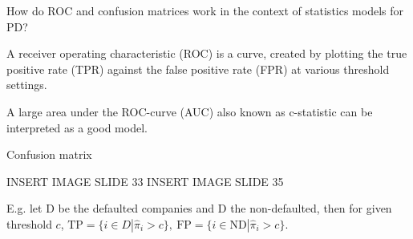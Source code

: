 How do ROC and confusion matrices work in the context of statistics models for PD?


A receiver operating characteristic (ROC) is a curve, created by plotting the
true positive rate (TPR) against the false positive rate (FPR) at various
threshold settings.

A large area under the ROC-curve (AUC) also known as c-statistic can be interpreted as a good model.

Confusion matrix

INSERT IMAGE SLIDE 33
INSERT IMAGE SLIDE 35



E.g. let \( \text{D} \) be the defaulted companies and \( \text{D} \) the non-defaulted,
then for given threshold \( c \), \( \text{TP} = \{i \in D | \hat{\pi}_i > c\},\ \text{FP} = \{i \in \text{ND} | \hat{\pi}_i > c\} \).

